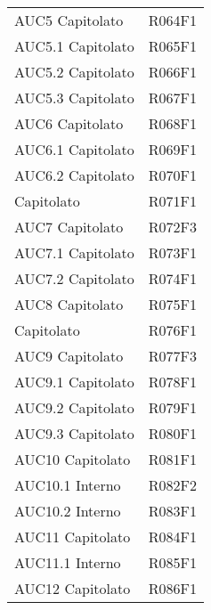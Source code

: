 \documentclass[../analisi-dei-requisiti.tex]{subfiles}
\begin{document}
\begin{longtable}[H]{ p{4cm} | p{4cm} }
  AUC5 Capitolato               & R064F1                               \\
  AUC5.1 Capitolato             & R065F1                               \\
  AUC5.2 Capitolato             & R066F1                               \\
  AUC5.3 Capitolato             & R067F1                               \\
  AUC6 Capitolato               & R068F1                               \\
  AUC6.1 Capitolato             & R069F1                               \\
  AUC6.2 Capitolato             & R070F1                               \\
  Capitolato                    & R071F1                               \\
  AUC7 Capitolato               & R072F3                               \\
  AUC7.1 Capitolato             & R073F1                               \\
  AUC7.2 Capitolato             & R074F1                               \\
  AUC8 Capitolato               & R075F1                               \\
  Capitolato                    & R076F1                               \\
  AUC9 Capitolato               & R077F3                               \\
  AUC9.1 Capitolato             & R078F1                               \\
  AUC9.2 Capitolato             & R079F1                               \\
  AUC9.3 Capitolato             & R080F1                               \\
  AUC10 Capitolato              & R081F1                               \\
  AUC10.1 Interno               & R082F2                               \\
  AUC10.2 Interno               & R083F1                               \\
  AUC11 Capitolato              & R084F1                               \\
  AUC11.1 Interno               & R085F1                               \\
  AUC12 Capitolato              & R086F1                               \\

\end{longtable}
\end{document}
